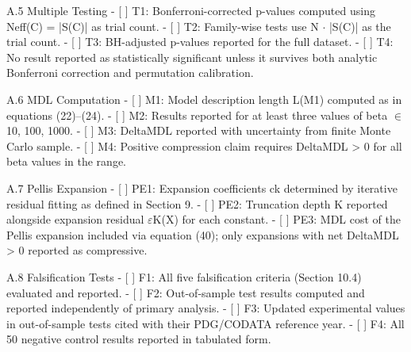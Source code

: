   A.5 Multiple Testing
  - [ ] T1: Bonferroni-corrected p-values computed using Neff(C) = |S(C)| as trial count.
  - [ ] T2: Family-wise tests use N $\cdot$ |S(C)| as the trial count.
  - [ ] T3: BH-adjusted p-values reported for the full dataset.
  - [ ] T4: No result reported as statistically significant unless it survives both analytic
  Bonferroni correction and permutation calibration.

  A.6 MDL Computation
  - [ ] M1: Model description length L(M1) computed as in equations (22)--(24).
  - [ ] M2: Results reported for at least three values of beta $\in$ {10, 100, 1000}.
  - [ ] M3: DeltaMDL reported with uncertainty from finite Monte Carlo sample.
  - [ ] M4: Positive compression claim requires DeltaMDL > 0 for all beta values in the
  range.

  A.7 Pellis Expansion
  - [ ] PE1: Expansion coefficients ck determined by iterative residual fitting as defined in
  Section 9.
  - [ ] PE2: Truncation depth K reported alongside expansion residual $\varepsilon$K(X) for each
  constant.
  - [ ] PE3: MDL cost of the Pellis expansion included via equation (40); only expansions
  with net DeltaMDL > 0 reported as compressive.

  A.8 Falsification Tests
  - [ ] F1: All five falsification criteria (Section 10.4) evaluated and reported.
  - [ ] F2: Out-of-sample test results computed and reported independently of primary
  analysis.
  - [ ] F3: Updated experimental values in out-of-sample tests cited with their
  PDG/CODATA reference year.
  - [ ] F4: All 50 negative control results reported in tabulated form.

